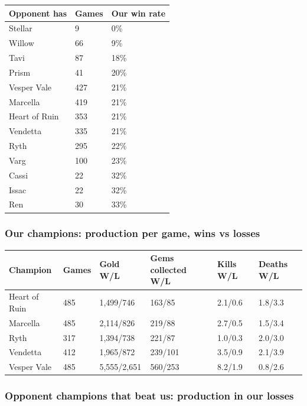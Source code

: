 \documentclass[
  10pt,
]{article}
\newcounter{none} %
\begin{document}
{\def\LTcaptype{none} %
\begin{longtable}[]{@{}lll@{}}
\toprule\noalign{}
Opponent has & Games & Our win rate \\
\midrule\noalign{}
\endhead
\bottomrule\noalign{}
\endlastfoot
Stellar & 9 & 0\% \\
Willow & 66 & 9\% \\
Tavi & 87 & 18\% \\
Prism & 41 & 20\% \\
Vesper Vale & 427 & 21\% \\
Marcella & 419 & 21\% \\
Heart of Ruin & 353 & 21\% \\
Vendetta & 335 & 21\% \\
Ryth & 295 & 22\% \\
Varg & 100 & 23\% \\
Cassi & 22 & 32\% \\
Issac & 22 & 32\% \\
Ren & 30 & 33\% \\
\end{longtable}
}

\subsubsection{Our champions: production per game, wins vs
losses}\label{our-champions-production-per-game-wins-vs-losses}

{\def\LTcaptype{none} %
\begin{longtable}[]{@{}llllll@{}}
\toprule\noalign{}
Champion & Games & Gold W/L & Gems collected W/L & Kills W/L & Deaths
W/L \\
\midrule\noalign{}
\endhead
\bottomrule\noalign{}
\endlastfoot
Heart of Ruin & 485 & 1,499/746 & 163/85 & 2.1/0.6 & 1.8/3.3 \\
Marcella & 485 & 2,114/826 & 219/88 & 2.7/0.5 & 1.5/3.4 \\
Ryth & 317 & 1,394/738 & 221/87 & 1.0/0.3 & 2.0/3.0 \\
Vendetta & 412 & 1,965/872 & 239/101 & 3.5/0.9 & 2.1/3.9 \\
Vesper Vale & 485 & 5,555/2,651 & 560/253 & 8.2/1.9 & 0.8/2.6 \\
\end{longtable}
}

\subsubsection{Opponent champions that beat us: production in our
losses}\label{opponent-champions-that-beat-us-production-in-our-losses}
\end{document}
